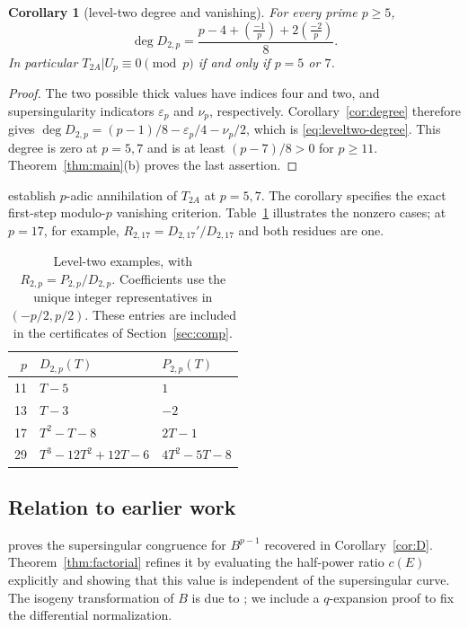 \documentclass[11pt,a4paper]{article}
\numberwithin{equation}{section}
\newtheorem{corollary}[theorem]{Corollary}
\theoremstyle{definition}
\theoremstyle{remark}
\begin{document}
\begin{corollary}[level-two degree and vanishing]\label{cor:leveltwo-vanishing}
For every prime $p\ge5$,
\begin{equation}\label{eq:leveltwo-degree}
\deg D_{2,p}=\frac{p-4+\left(\frac{-1}{p}\right)+2\left(\frac{-2}{p}\right)}8.
\end{equation}
In particular $T_{2A}|U_p\equiv0\pmod p$ if and only if $p=5$ or $7$.
\end{corollary}
\begin{proof}
The two possible thick values have indices four and two, and supersingularity
indicators $\varepsilon_p$ and $\nu_p$, respectively. Corollary~\ref{cor:degree}
therefore gives
$\deg D_{2,p}=(p-1)/8-\varepsilon_p/4-\nu_p/2$, which is
\eqref{eq:leveltwo-degree}. This degree is zero at $p=5,7$ and is at least
$(p-7)/8>0$ for $p\ge11$. Theorem~\ref{thm:main}(b) proves the last assertion.
\end{proof}

\citet[Lemma~4.8 and Table~4.3]{CMT19} establish $p$-adic
annihilation of $T_{2A}$ at $p=5,7$. The corollary specifies the exact
first-step modulo-$p$ vanishing criterion. Table~\ref{tab:leveltwo-examples}
illustrates the nonzero cases; at $p=17$, for example,
$R_{2,17}=D_{2,17}'/D_{2,17}$ and both residues are one.

\begin{table}[htbp]\centering
\begin{tabular}{rll}\toprule
$p$ & $D_{2,p}(T)$ & $P_{2,p}(T)$\\\midrule
11 & $T-5$ & $1$\\
13 & $T-3$ & $-2$\\
17 & $T^2-T-8$ & $2T-1$\\
29 & $T^3-12T^2+12T-6$ & $4T^2-5T-8$\\\bottomrule
\end{tabular}
\caption{Level-two examples, with $R_{2,p}=P_{2,p}/D_{2,p}$.
Coefficients use the unique integer representatives in $(-p/2,p/2)$.
These entries are included in the certificates of Section~\ref{sec:comp}.}
\label{tab:leveltwo-examples}
\end{table}

\subsection{Relation to earlier work}
\citet{Baker98} proves the supersingular congruence for $B^{p-1}$
recovered in Corollary~\ref{cor:D}. Theorem~\ref{thm:factorial}
refines it by evaluating the half-power ratio $c(E)$ explicitly and
showing that this value is independent of the supersingular curve.
The isogeny transformation of $B$ is due to
\citet[Th\'eor\`eme B, p.~106; \S3.3, Lemma~7 and (19), p.~124]{Robert80};
we include a $q$-expansion proof to fix the differential normalization.
\end{document}
